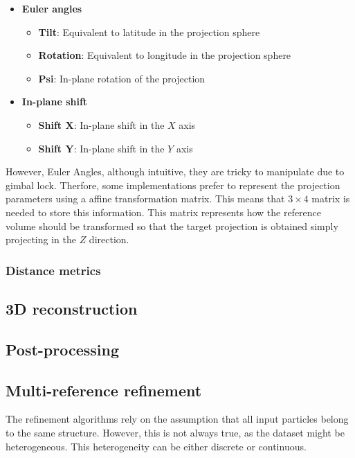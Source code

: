 \documentclass[../main.tex]{subfiles}
\begin{document}
\begin{itemize}
    \item \textbf{Euler angles}
    \begin{itemize}
        \item \textbf{Tilt}: Equivalent to latitude in the projection sphere
        \item \textbf{Rotation}: Equivalent to longitude in the projection sphere
        \item \textbf{Psi}: In-plane rotation of the projection
    \end{itemize}
    \item \textbf{In-plane shift}
    \begin{itemize}
        \item \textbf{Shift X}: In-plane shift in the $X$ axis
        \item \textbf{Shift Y}: In-plane shift in the $Y$ axis
    \end{itemize}
\end{itemize}

However, Euler Angles, although intuitive, they are tricky to manipulate due to gimbal lock. Therfore, some implementations prefer to represent the projection parameters using a affine transformation matrix. This means that $3\times4$ matrix is needed to store this information. This matrix represents how the reference volume should be transformed so that the target projection is obtained simply projecting in the $Z$ direction\cite{delarosa2016}.

\subsubsection{Distance metrics}

\subsection{3D reconstruction}

\subsection{Post-processing}

\subsection{Multi-reference refinement}
The refinement algorithms rely on the assumption that all input particles belong to the same structure. However, this is not always true, as the dataset might be heterogeneous. This heterogeneity can be either discrete or continuous. 
\end{document}
